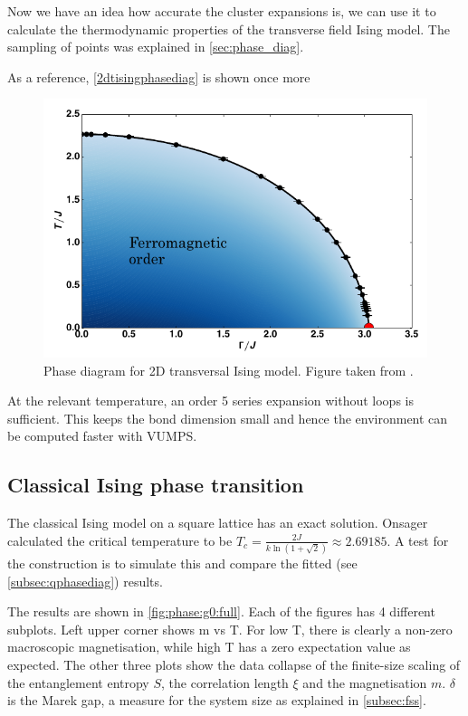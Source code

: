 
Now we have an idea how accurate the cluster expansions is, we can use it to calculate the thermodynamic properties of the transverse field Ising model. The sampling of points was explained in \cref{sec:phase_diag}.

As a reference, \cref{2dtisingphasediag} is shown once more

\begin{figure}[H]
    \center
    \includegraphics[width=\textwidth]{Figuren/phsyics/2disingphase.png}
    \caption{Phase diagram for 2D transversal Ising model. Figure taken from \cite{Hesselmann2016}.}
    \label{2dtisingphasediag2}
\end{figure}

At the relevant temperature, an order 5 series expansion without loops is sufficient. This keeps the bond dimension small and hence the environment can be computed faster with VUMPS.

\subsection{Classical Ising phase transition}
The classical Ising model on a square lattice has an exact solution. Onsager calculated the critical temperature to be $T_c = \frac{2 J}{k \ln(1+\sqrt{2}) } \approx 2.69185$. A test for the construction is to simulate this and compare the fitted (see \cref{subsec:qphasediag}) results.

The results are shown in \cref{fig:phase:g0:full}. Each of the figures has 4 different subplots. Left upper corner shows m vs T. For low T, there is clearly a non-zero macroscopic magnetisation, while high T has a zero expectation value as expected. The other three plots show the data collapse of the finite-size scaling of the entanglement entropy $S$, the correlation length $\xi$ and the magnetisation $m$. $\delta$ is the Marek gap, a measure for the system size as explained in \cref{subsec:fss}.

